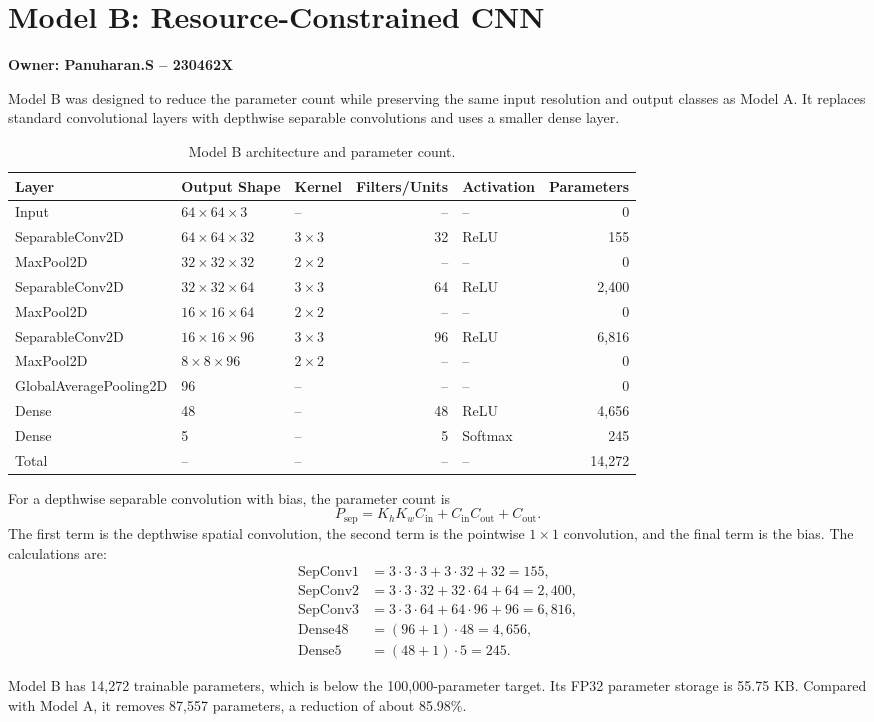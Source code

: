 \section{Model B: Resource-Constrained CNN}
\textbf{Owner: Panuharan.S -- 230462X}

Model B was designed to reduce the parameter count while preserving the same input resolution and output classes as Model A. It replaces standard convolutional layers with depthwise separable convolutions and uses a smaller dense layer.

\begin{table}[H]
\centering
\caption{Model B architecture and parameter count.}
\label{tab:model_b_arch}
\small
\begin{tabularx}{\linewidth}{l l l r l r}
\toprule
Layer & Output Shape & Kernel & Filters/Units & Activation & Parameters \\
\midrule
Input & $64\times64\times3$ & -- & -- & -- & 0 \\
SeparableConv2D & $64\times64\times32$ & $3\times3$ & 32 & ReLU & 155 \\
MaxPool2D & $32\times32\times32$ & $2\times2$ & -- & -- & 0 \\
SeparableConv2D & $32\times32\times64$ & $3\times3$ & 64 & ReLU & 2,400 \\
MaxPool2D & $16\times16\times64$ & $2\times2$ & -- & -- & 0 \\
SeparableConv2D & $16\times16\times96$ & $3\times3$ & 96 & ReLU & 6,816 \\
MaxPool2D & $8\times8\times96$ & $2\times2$ & -- & -- & 0 \\
GlobalAveragePooling2D & 96 & -- & -- & -- & 0 \\
Dense & 48 & -- & 48 & ReLU & 4,656 \\
Dense & 5 & -- & 5 & Softmax & 245 \\
\midrule
Total & -- & -- & -- & -- & 14,272 \\
\bottomrule
\end{tabularx}
\end{table}

For a depthwise separable convolution with bias, the parameter count is
\begin{equation}
P_{\mathrm{sep}} = K_hK_wC_{\mathrm{in}} + C_{\mathrm{in}}C_{\mathrm{out}} + C_{\mathrm{out}}.
\end{equation}
The first term is the depthwise spatial convolution, the second term is the pointwise $1\times1$ convolution, and the final term is the bias. The calculations are:
\begin{align}
\mathrm{SepConv1} &= 3\cdot3\cdot3 + 3\cdot32 + 32 = 155,\\
\mathrm{SepConv2} &= 3\cdot3\cdot32 + 32\cdot64 + 64 = 2,400,\\
\mathrm{SepConv3} &= 3\cdot3\cdot64 + 64\cdot96 + 96 = 6,816,\\
\mathrm{Dense48} &= (96 + 1)\cdot48 = 4,656,\\
\mathrm{Dense5} &= (48 + 1)\cdot5 = 245.
\end{align}

Model B has 14,272 trainable parameters, which is below the 100,000-parameter target. Its FP32 parameter storage is 55.75 KB. Compared with Model A, it removes 87,557 parameters, a reduction of about 85.98\%.
